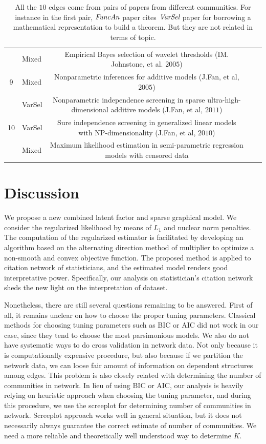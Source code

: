 \documentclass[AMS,STIX1COL]{WileyNJD-v2}
\begin{document}
{\begin{table}[htbp]
\begin{tabular}{clclc}
     & Mixed      & Empirical {B}ayes selection of wavelet thresholds (IM. Johnstone, et al. $2005$)                         & \\
9    & Mixed    & Nonparametric inferences for additive models (J.Fan, et al, $2005$)                  & \\
     & VarSel    & Nonparametric independence screening in sparse ultra-high-dimensional additive models
     (J.Fan, et al, $2011$)     & \\
10   & VarSel    & Sure independence screening in generalized linear models with {NP}-dimensionality
    (J.Fan, et al, $2010$) & \\
     & Mixed     & Maximum likelihood estimation in semi-parametric regression models with censored data  & \\
\hline
\end{tabular}
\caption{All the $10$ edges come from pairs of papers from different communities. For instance in the first pair, $\emph{FuncAn}$ paper cites $\emph{VarSel}$ paper for borrowing a mathematical representation to build a theorem. But they are not related in terms of topic.}
\end{table}
\label{tab:table2}

\section{Discussion}
\label{sec:Con}

We propose a new combined latent factor and sparse graphical model.
We consider the regularized likelihood by means of $L_1$ and nuclear norm penalties.
The computation of the regularized estimator is facilitated by developing an algorithm based on the alternating direction method of multiplier to optimize a non-smooth and convex objective function.
The proposed method is applied to citation network of statisticians, and the estimated model renders good interpretative power.
Specifically, our analysis on statistician's citation network sheds the new light on the interpretation of dataset.

Nonetheless, there are still several questions remaining to be answered.
First of all, it remains unclear on how to choose the proper tuning parameters.
Classical methods for choosing tuning parameters such as BIC or AIC did not work in our case, since they tend to choose the most parsimonious models.
We also do not have systematic ways to do cross validation in network data.
Not only because it is computationally expensive procedure, but also because if we partition the network data, we can loose fair amount of information on dependent structures among edges.
This problem is also closely related with determining the number of communities in network.
In lieu of using BIC or AIC, our analysis is heavily relying on heuristic approach when choosing the tuning parameter, and during this procedure, we use the screeplot for determining number of communities in network.
Screeplot approach works well in general situation, but it does not necessarily always guarantee the correct estimate of number of communities.
We need a more reliable and theoretically well understood way to determine $K$.

}
\end{document}
